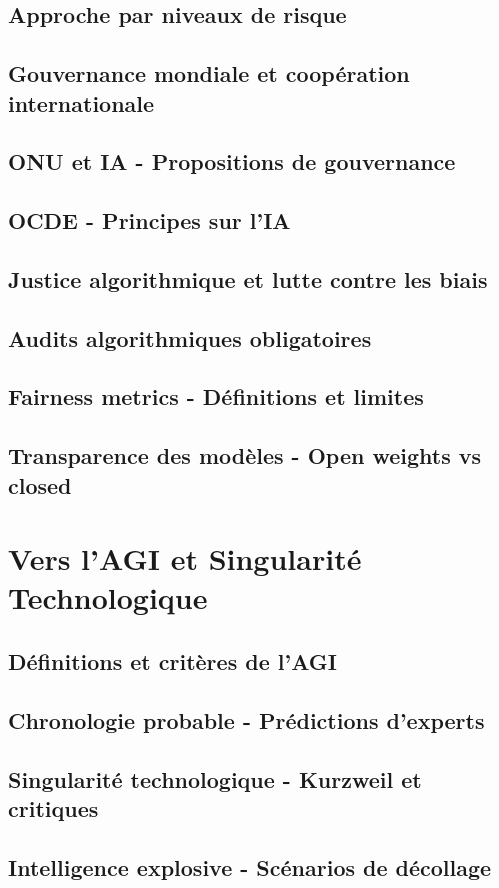 \documentclass[12pt,a4paper]{book}
\begin{document}
\section{Approche par niveaux de risque}
\section{Gouvernance mondiale et coopération internationale}
\section{ONU et IA - Propositions de gouvernance}
\section{OCDE - Principes sur l'IA}
\section{Justice algorithmique et lutte contre les biais}
\section{Audits algorithmiques obligatoires}
\section{Fairness metrics - Définitions et limites}
\section{Transparence des modèles - Open weights vs closed}

\chapter{Vers l'AGI et Singularité Technologique}
\section{Définitions et critères de l'AGI}
\section{Chronologie probable - Prédictions d'experts}
\section{Singularité technologique - Kurzweil et critiques}
\section{Intelligence explosive - Scénarios de décollage}
\end{document}
